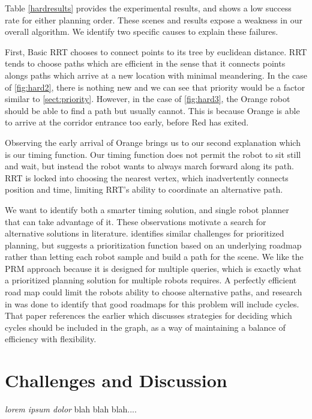 \documentclass[12pt,journal,compsoc]{IEEEtran}
\begin{document}
Table \ref{hardresults} provides the experimental results, and shows a low success rate for either planning order. These scenes and results expose a weakness in our overall algorithm. We identify two specific causes to explain these failures. 
\par
First, Basic RRT chooses to connect points to its tree by euclidean distance. RRT tends to choose paths which are efficient in the sense that it connects points alongs paths which arrive at a new location with minimal meandering. In the case of \ref{fig:hard2}, there is nothing new and we can see that priority would be a factor similar to \ref{sect:priority}. However, in the case of \ref{fig:hard3}, the Orange robot should be able to find a path but usually cannot. This is because Orange is able to arrive at the corridor entrance too early, before Red has exited.
\par
Observing the early arrival of Orange brings us to our second explanation which is our timing function. Our timing function does not permit the robot to sit still and wait, but instead the robot wants to always march forward along its path. RRT is locked into choosing the nearest vertex, which inadvertently connects position and time, limiting RRT's ability to coordinate an alternative path.
\par
We want to identify both a smarter timing solution, and single robot planner that can take advantage of it. These observations motivate a search for alternative solutions in literature. \cite{bergprm} identifies similar challenges for prioritized planning, but suggests a prioritization function based on an underlying roadmap rather than letting each robot sample and build a path for the scene. We like the PRM approach because it is designed for multiple queries, which is exactly what a prioritized planning solution for multiple robots requires. A perfectly efficient road map could limit the robots ability to choose alternative paths, and research in \cite{bergprm} was done to identify that good roadmaps for this problem will include cycles. That paper references the earlier \cite{overcycles} which discusses strategies for deciding which cycles should be included in the graph, as a way of maintaining a balance of efficiency with flexibility.

\section{Challenges and Discussion}
\emph{lorem ipsum dolor} blah blah blah....
\end{document}

